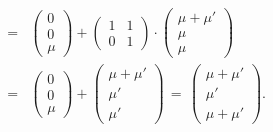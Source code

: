 \begin{eqnarray*}
&=&
\left(\begin{matrix} 0 \\ 0 \\ \mu \end{matrix}\right)
+
\left(\begin{matrix} 1 & 1 \\ 0 & 1 \end{matrix}\right) \cdot
\left(\begin{matrix} \mu + \mu' \\ \mu \\ \mu \end{matrix}\right)\\
&=&
\left(\begin{matrix} 0 \\ 0 \\ \mu \end{matrix}\right)
+
\left(\begin{matrix} \mu + \mu' \\ \mu' \\ \mu' \end{matrix}\right)
\,=\,
\left(\begin{matrix} \mu + \mu' \\ \mu' \\ \mu + \mu' \end{matrix}\right).
\end{eqnarray*}

